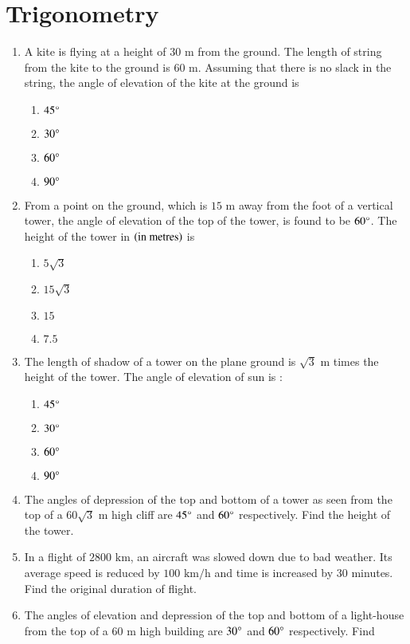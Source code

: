 \documentclass[journal,12pt,onecolumn]{IEEEtran}
\theoremstyle{remark}
\begin{document}
\section{Trigonometry}
\begin{enumerate}
\item A kite is flying at a height of $30 \text{ m}$ from the ground. The length of string from the kite to the ground is $60 \text{ m}$. Assuming that there is no slack in the string, the angle of elevation of the kite at the ground is 
\begin{enumerate}
\item $45\degree$ 
\item $30\degree$ 
\item $60\degree$ 
\item $90\degree$ 
\end{enumerate}
\item From a point on the ground, which is $15\text{ m}$ away from the foot of a vertical tower, the angle of elevation of the top of the tower, is found to be $60\degree$. The height of the tower in $\left(\text{in metres}\right)$ is 
\begin{enumerate}
\item $5\sqrt 3$ 
\item $15\sqrt 3$ 
\item $15$ 
\item $7.5$ 
\end{enumerate}
\item The length of shadow of a tower on the plane ground is $\sqrt 3 \text{ m}$ times the height of the tower. The angle of elevation of sun is : 
\begin{enumerate}
\item $45\degree$ 
\item $30\degree$ 
\item $60\degree$ 
\item $90\degree$ 
\end{enumerate}
\item The angles of depression of the top and bottom of a tower as seen from the top of a $60\sqrt 3 \text{ m}$ high cliff are $45\degree$ and $60\degree$ respectively. Find the height of the tower. 
\item In a flight of $2800 \text{ km}$, an aircraft was slowed down due to bad weather. Its average speed is reduced by $100 \text{ km/h}$ and time is increased by $30$ minutes. Find the original duration of flight. 
\item The angles of elevation and depression of the top and bottom of a light-house from the top of a $60 \text{ m}$ high building are $30\degree$ and $60\degree$ respectively. Find 

\end{enumerate}
\end{document}
